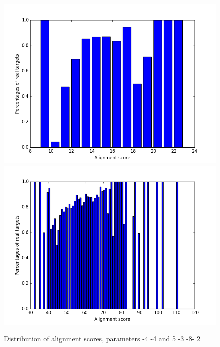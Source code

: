 \documentclass[12pt]{article}
\begin{document}
\begin{figure}
\includegraphics[scale=0.35]{results/plot_scores-4-4.png}
\includegraphics[scale=0.35]{results/plot_scores5-3-8-2.png}
\caption{Distribution of alignment scores, parameters -4 -4 and 5 -3 -8- 2}
\label{fig:distribution}
\end{figure}
\end{document}
